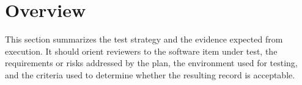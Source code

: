 \section{Overview}
This section summarizes the test strategy and the evidence expected from
execution.  It should orient reviewers to the software item under test, the
requirements or risks addressed by the plan, the environment used for testing,
and the criteria used to determine whether the resulting record is acceptable.

